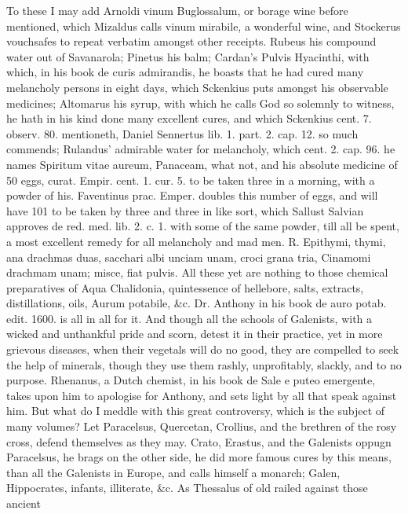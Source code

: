 To these I may add Arnoldi vinum Buglossalum, or borage wine before
mentioned, which Mizaldus calls vinum mirabile, a wonderful wine,
and Stockerus vouchsafes to repeat verbatim amongst other receipts.
Rubeus his compound water out of Savanarola; Pinetus his balm;
Cardan's Pulvis Hyacinthi, with which, in his book de curis admirandis,
he boasts that he had cured many melancholy persons in eight days,
which Sckenkius puts amongst his observable medicines; Altomarus
his syrup, with which he calls God so solemnly to witness, he
hath in his kind done many excellent cures, and which Sckenkius cent.
7. observ. 80. mentioneth, Daniel Sennertus lib. 1. part. 2. cap. 12.
so much commends; Rulandus' admirable water for melancholy, which cent.
2. cap. 96. he names Spiritum vitae aureum, Panaceam, what not, and his
absolute medicine of 50 eggs, curat. Empir. cent. 1. cur. 5. to be
taken three in a morning, with a powder of his. Faventinus prac.
Emper. doubles this number of eggs, and will have 101 to be taken by
three and three in like sort, which Sallust Salvian approves de red.
med. lib. 2. c. 1. with some of the same powder, till all be spent, a
most excellent remedy for all melancholy and mad men.
℞. Epithymi, thymi, ana drachmas duas, sacchari albi unciam unam, croci
grana tria, Cinamomi drachmam unam; misce, fiat pulvis.
All these yet are nothing to those chemical preparatives of Aqua
Chalidonia, quintessence of hellebore, salts, extracts, distillations,
oils, Aurum potabile, \&c. Dr. Anthony in his book de auro potab. edit.
1600. is all in all for it. And though all the schools of
Galenists, with a wicked and unthankful pride and scorn, detest it in
their practice, yet in more grievous diseases, when their vegetals will
do no good, they are compelled to seek the help of minerals, though
they use them rashly, unprofitably, slackly, and to no purpose.
Rhenanus, a Dutch chemist, in his book de Sale e puteo emergente, takes
upon him to apologise for Anthony, and sets light by all that speak
against him. But what do I meddle with this great controversy, which is
the subject of many volumes? Let Paracelsus, Quercetan, Crollius, and
the brethren of the rosy cross, defend themselves as they may. Crato,
Erastus, and the Galenists oppugn Paracelsus, he brags on the other
side, he did more famous cures by this means, than all the Galenists in
Europe, and calls himself a monarch; Galen, Hippocrates, infants,
illiterate, \&c. As Thessalus of old railed against those ancient
